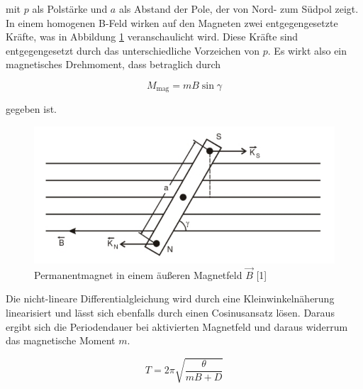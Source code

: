 mit $p$ als Polstärke und $a$ als Abstand der Pole, der von Nord- zum Südpol 
zeigt. In einem homogenen B-Feld wirken auf den Magneten zwei entgegengesetzte
Kräfte, was in Abbildung \ref{fig:Magnet} veranschaulicht wird. Diese Kräfte sind entgegengesetzt
durch das unterschiedliche Vorzeichen von $p$. Es wirkt also ein magnetisches 
Drehmoment, dass betraglich durch

\begin{equation*}
M_\text{mag} = m B \sin{\gamma}
\end{equation*}

gegeben ist. 

\begin{figure}
  \centering
  \includegraphics[scale=0.3]{content/Magnet.png}
  \caption{Permanentmagnet in einem äußeren Magnetfeld $\vec{B}$ [1]}
  \label{fig:Magnet}
\end{figure}

Die nicht-lineare Differentialgleichung wird durch eine Kleinwinkelnäherung linearisiert
und lässt sich ebenfalls durch einen Cosinusansatz lösen. Daraus ergibt sich die Periodendauer
bei aktivierten Magnetfeld und daraus widerrum das magnetische Moment $m$.

\begin{equation}
T = 2\pi \sqrt{\frac{\theta}{mB+D}} 
\label{eqn:PeriodeM}
\end{equation}